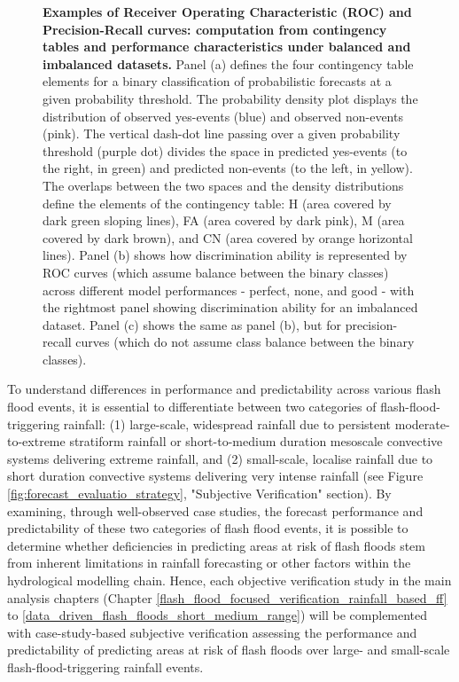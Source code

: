 \begin{figure}[htbp]
\caption{\textbf{Examples of Receiver Operating Characteristic (ROC) and Precision-Recall curves: computation from contingency tables and performance characteristics under balanced and imbalanced datasets.} Panel (a) defines the four contingency table elements for a binary classification of probabilistic forecasts at a given probability threshold. The probability density plot displays the distribution of observed yes-events (blue) and observed non-events (pink). The vertical dash-dot line passing over a given probability threshold (purple dot) divides the space in predicted yes-events (to the right, in green) and predicted non-events (to the left, in yellow). The overlaps between the two spaces and the density distributions define the elements of the contingency table: H (area covered by dark green sloping lines), FA (area covered by dark pink), M (area covered by dark brown), and CN (area covered by orange horizontal lines). Panel (b) shows how discrimination ability is represented by ROC curves (which assume balance between the binary classes) across different model performances - perfect, none, and good - with the rightmost panel showing discrimination ability for an imbalanced dataset. Panel (c) shows the same as panel (b), but for precision-recall curves (which do not assume class balance between the binary classes).}
\label{fig:curve_roc_pr_examples}
\end{figure}

To  understand differences in performance and predictability across various flash flood events, it is essential to differentiate between two categories of flash-flood-triggering rainfall: (1) large-scale, widespread rainfall due to persistent moderate-to-extreme stratiform rainfall or short-to-medium duration mesoscale convective systems delivering extreme rainfall, and (2) small-scale, localise rainfall due to short duration convective systems delivering very intense rainfall (see Figure \ref{fig:forecast_evaluatio_strategy}, "Subjective Verification" section). By examining, through well-observed case studies, the forecast performance and predictability of these two categories of flash flood events, it is possible to determine whether deficiencies in predicting areas at risk of flash floods stem from inherent limitations in rainfall forecasting or other factors within the hydrological modelling chain. Hence, each objective verification study in the main analysis chapters (Chapter \ref{flash_flood_focused_verification_rainfall_based_ff} to \ref{data_driven_flash_floods_short_medium_range}) will be complemented with case-study-based subjective verification assessing the performance and predictability of predicting areas at risk of flash floods over large- and small-scale flash-flood-triggering rainfall events.


